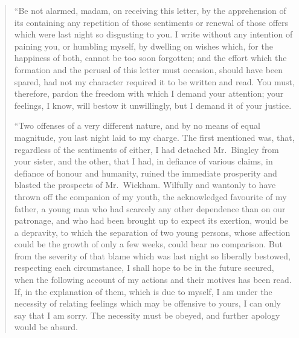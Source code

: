 \documentclass[12pt,english]{book}
\begin{document}
\begin{quotation}
{}``Be not alarmed, madam, on receiving this letter, by the apprehension
of its containing any repetition of those sentiments or renewal of
those offers which were last night so disgusting to you. I write without
any intention of paining you, or humbling myself, by dwelling on wishes
which, for the happiness of both, cannot be too soon forgotten; and
the effort which the formation and the perusal of this letter must
occasion, should have been spared, had not my character required it
to be written and read. You must, therefore, pardon the freedom with
which I demand your attention; your feelings, I know, will bestow
it unwillingly, but I demand it of your justice.

{}``Two offenses of a very different nature, and by no means of equal
magnitude, you last night laid to my charge. The first mentioned was,
that, regardless of the sentiments of either, I had detached Mr.\ Bingley
from your sister, and the other, that I had, in defiance of various
claims, in defiance of honour and humanity, ruined the immediate prosperity
and blasted the prospects of Mr.\ Wickham. Wilfully and wantonly
to have thrown off the companion of my youth, the acknowledged favourite
of my father, a young man who had scarcely any other dependence than
on our patronage, and who had been brought up to expect its exertion,
would be a depravity, to which the separation of two young persons,
whose affection could be the growth of only a few weeks, could bear
no comparison. But from the severity of that blame which was last
night so liberally bestowed, respecting each circumstance, I shall
hope to be in the future secured, when the following account of my
actions and their motives has been read. If, in the explanation of
them, which is due to myself, I am under the necessity of relating
feelings which may be offensive to yours, I can only say that I am
sorry. The necessity must be obeyed, and further apology would be
absurd.


\end{quotation}
\end{document}

